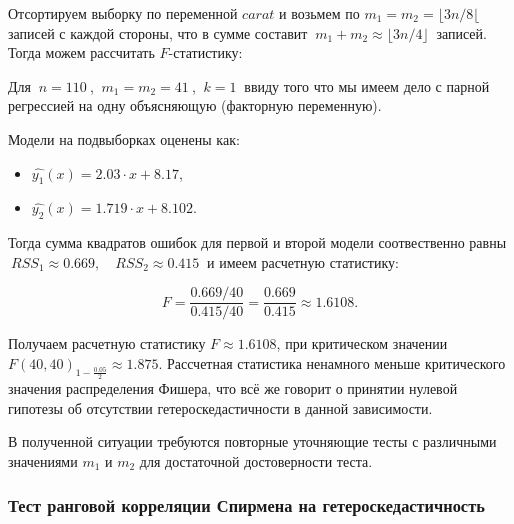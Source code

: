 \documentclass[
]{article}
\begin{document}
Отсортируем выборку по переменной \(carat\) и возьмем по
\(m_1 = m_2 = \lfloor3n/8\lfloor\) записей с каждой стороны, что в сумме
составит \(\ m_1 + m_2 \approx \lfloor3n/4\rfloor\ \) записей. Тогда
можем рассчитать \(F\)-статистику:

Для \(\ n = 110\ \), \(\ m_1 = m_2 = 41\ \), \(\ k = 1\ \) ввиду того
что мы имеем дело с парной регрессией на одну объясняющую (факторную
переменную).

Модели на подвыборках оценены как:

\begin{itemize}
\item
  \(\hat{y_1}(x) = 2.03 \cdot x + 8.17\),
\item
  \(\hat{y_2}(x) = 1.719 \cdot x + 8.102\).
\end{itemize}

Тогда сумма квадратов ошибок для первой и второй модели соотвественно
равны \(\ RSS_1 \approx 0.669, \quad RSS_2 \approx 0.415\ \) и имеем
расчетную статистику:

\[
F = \frac{0.669 / 40}{0.415 / 40} = \frac{0.669}{0.415} \approx 1.6108.
\]

Получаем расчетную статистику \(F \approx 1.6108\), при критическом
значении \(F(40, 40)_{1 - \frac{0.05}{2}} \approx 1.875\). Рассчетная
статистика ненамного меньше критического значения распределения Фишера,
что всё же говорит о принятии нулевой гипотезы об отсутствии
гетероскедастичности в данной зависимости.

В полученной ситуации требуются повторные уточняющие тесты с различными
значениями \(m_1\) и \(m_2\) для достаточной достоверности теста.

\hypertarget{ux442ux435ux441ux442-ux440ux430ux43dux433ux43eux432ux43eux439-ux43aux43eux440ux440ux435ux43bux44fux446ux438ux438-ux441ux43fux438ux440ux43cux435ux43dux430-ux43dux430-ux433ux435ux442ux435ux440ux43eux441ux43aux435ux434ux430ux441ux442ux438ux447ux43dux43eux441ux442ux44c}{%
\subsubsection{\texorpdfstring{\textbf{Тест ранговой корреляции Спирмена
на
гетероскедастичность}}{Тест ранговой корреляции Спирмена на гетероскедастичность}}\label{ux442ux435ux441ux442-ux440ux430ux43dux433ux43eux432ux43eux439-ux43aux43eux440ux440ux435ux43bux44fux446ux438ux438-ux441ux43fux438ux440ux43cux435ux43dux430-ux43dux430-ux433ux435ux442ux435ux440ux43eux441ux43aux435ux434ux430ux441ux442ux438ux447ux43dux43eux441ux442ux44c}}
\end{document}
